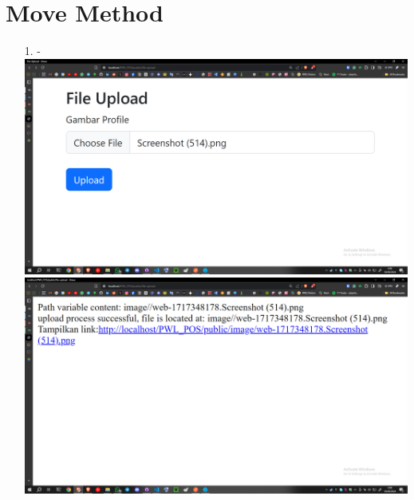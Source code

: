 \documentclass[12pt,titlepage]{article}
\begin{document}
\section{Move Method}
\begin{enumerate}
    \item[1.] - \\ \includegraphics[width=.9\textwidth]{images/figures/Screenshot (515).png} \\ \includegraphics[width=.9\textwidth]{images/figures/Screenshot (516).png}
\end{enumerate}
\end{document}
